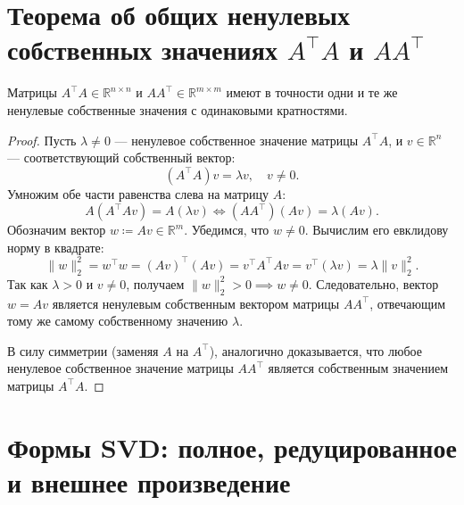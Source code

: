     \section{Теорема об общих ненулевых собственных значениях $A^\top A$ и $A A^\top$}

    \begin{theorem}
        Матрицы $A^\top A \in \mathbb{R}^{n \times n}$ и $A A^\top \in \mathbb{R}^{m \times m}$ имеют в точности
        одни и те же ненулевые собственные значения с одинаковыми кратностями.
    \end{theorem}
    \begin{proof}
        Пусть $\lambda \ne 0$ — ненулевое собственное значение матрицы $A^\top A$, и
        $v \in \mathbb{R}^n$ — соответствующий собственный вектор:
        \[ (A^\top A) v = \lambda v, \quad v \ne 0. \]
        Умножим обе части равенства слева на матрицу $A$:
        \[ A (A^\top A v) = A (\lambda v) \iff (A A^\top) (A v) = \lambda (A v). \]
        Обозначим вектор $w \coloneqq A v \in \mathbb{R}^m$.
        Убедимся, что $w \ne 0$.
        Вычислим его евклидову норму в квадрате:
        \[ \|w\|_2^2 = w^\top w = (Av)^\top (Av) = v^\top A^\top A v = v^\top (\lambda v) = \lambda \|v\|_2^2. \]
        Так как $\lambda > 0$ и $v \ne 0$, получаем $\|w\|_2^2 > 0 \implies w \ne 0$.
        Следовательно, вектор $w = Av$ является ненулевым собственным вектором матрицы $A A^\top$, отвечающим тому
        же самому собственному значению $\lambda$.

        В силу симметрии (заменяя $A$ на $A^\top$), аналогично доказывается, что любое ненулевое собственное
        значение матрицы $A A^\top$ является собственным значением матрицы $A^\top A$.
    \end{proof}

    \section{Формы SVD: полное, редуцированное и внешнее произведение}


